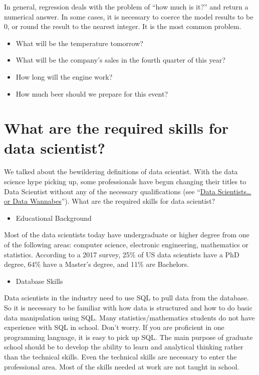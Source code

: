 \documentclass[]{book}
\providecommand{\tightlist}{%
  \setlength{\itemsep}{0pt}\setlength{\parskip}{0pt}}
\theoremstyle{definition}
\theoremstyle{definition}
\theoremstyle{remark}
\begin{document}
In general, regression deals with the problem of ``how much is it?'' and
return a numerical answer. In some cases, it is necessary to coerce the
model results to be 0, or round the result to the nearest integer. It is
the most common problem.

\begin{itemize}
\tightlist
\item
  What will be the temperature tomorrow?
\item
  What will be the company's sales in the fourth quarter of this year?
\item
  How long will the engine work?
\item
  How much beer should we prepare for this event?
\end{itemize}

\section{What are the required skills for data
scientist?}\label{what-are-the-required-skills-for-data-scientist}

We talked about the bewildering definitions of data scientist. With the
data science hype picking up, some professionals have begun changing
their titles to Data Scientist without any of the necessary
qualifications (see
``\href{http://www.burtchworks.com/2013/06/12/data-scientists-or-data-wannabes/}{Data
Scientists\ldots{}or Data Wannabes}''). What are the required skills for
data scientist?

\begin{itemize}
\tightlist
\item
  Educational Background
\end{itemize}

Most of the data scientists today have undergraduate or higher degree
from one of the following areas: computer science, electronic
engineering, mathematics or statistics. According to a 2017 survey, 25\%
of US data scientists have a PhD degree, 64\% have a Master's degree,
and 11\% are Bachelors.

\begin{itemize}
\tightlist
\item
  Database Skills
\end{itemize}

Data scientists in the industry need to use SQL to pull data from the
database. So it is necessary to be familiar with how data is structured
and how to do basic data manipulation using SQL. Many
statistics/mathematics students do not have experience with SQL in
school. Don't worry. If you are proficient in one programming language,
it is easy to pick up SQL. The main purpose of graduate school should be
to develop the ability to learn and analytical thinking rather than the
technical skills. Even the technical skills are necessary to enter the
professional area. Most of the skills needed at work are not taught in
school.
\end{document}
